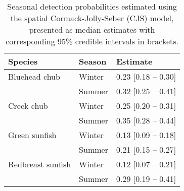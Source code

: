 \begin{table}[ht]
\centering
\caption{Seasonal detection probabilities estimated using the spatial Cormack-Jolly-Seber (CJS) model, presented as median estimates with corresponding 95\% credible intervals in brackets.} 
\label{tab:detection}
\begin{tabular}{lll}
  \hline
Species & Season & Estimate \\ 
  \hline
Bluehead chub & Winter & 0.23 [0.18 -- 0.30] \\ 
   & Summer & 0.32 [0.25 -- 0.41] \\ 
  Creek chub & Winter & 0.25 [0.20 -- 0.31] \\ 
   & Summer & 0.35 [0.28 -- 0.44] \\ 
  Green sunfish & Winter & 0.13 [0.09 -- 0.18] \\ 
   & Summer & 0.21 [0.15 -- 0.27] \\ 
  Redbreast sunfish & Winter & 0.12 [0.07 -- 0.21] \\ 
   & Summer & 0.29 [0.19 -- 0.41] \\ 
   \hline
\end{tabular}
\end{table}
